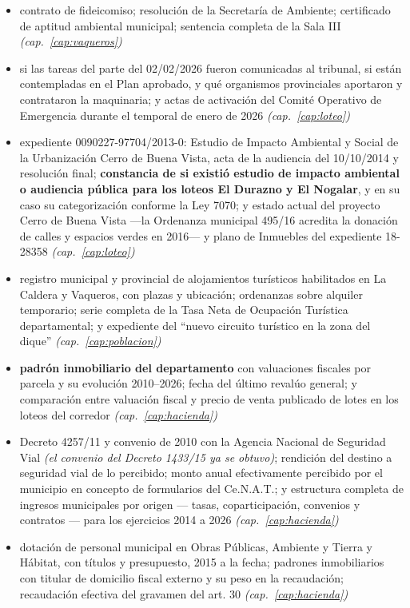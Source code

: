 \begin{itemize}[leftmargin=*]
\item contrato de fideicomiso; resolución de la Secretaría de Ambiente; certificado de aptitud ambiental municipal; sentencia completa de la Sala III \textit{(cap.\ \ref{cap:vaqueros})}
\item si las tareas del parte del 02/02/2026 fueron comunicadas al tribunal, si están contempladas en el Plan aprobado, y qué organismos provinciales aportaron y contrataron la maquinaria; y actas de activación del Comité Operativo de Emergencia durante el temporal de enero de 2026 \textit{(cap.\ \ref{cap:loteo})}
\item expediente 0090227-97704/2013-0: Estudio de Impacto Ambiental y Social de la Urbanización Cerro de Buena Vista, acta de la audiencia del 10/10/2014 y resolución final; \textbf{constancia de si existió estudio de impacto ambiental o audiencia pública para los loteos El Durazno y El Nogalar}, y en su caso su categorización conforme la Ley 7070; y estado actual del proyecto Cerro de Buena Vista ---la Ordenanza municipal 495/16 acredita la donación de calles y espacios verdes en 2016--- y plano de Inmuebles del expediente 18-28358 \textit{(cap.\ \ref{cap:loteo})}
\item registro municipal y provincial de alojamientos turísticos habilitados en La Caldera y Vaqueros, con plazas y ubicación; ordenanzas sobre alquiler temporario; serie completa de la Tasa Neta de Ocupación Turística departamental; y expediente del ``nuevo circuito turístico en la zona del dique'' \textit{(cap.\ \ref{cap:poblacion})}
\item \textbf{padrón inmobiliario del departamento} con valuaciones fiscales por parcela y su evolución 2010--2026; fecha del último revalúo general; y comparación entre valuación fiscal y precio de venta publicado de lotes en los loteos del corredor \textit{(cap.\ \ref{cap:hacienda})}
\item Decreto 4257/11 y convenio de 2010 con la Agencia Nacional de Seguridad Vial \textit{(el convenio del Decreto 1433/15 ya se obtuvo)}; rendición del destino a seguridad vial de lo percibido; monto anual efectivamente percibido por el municipio en concepto de formularios del Ce.N.A.T.; y estructura completa de ingresos municipales por origen --- tasas, coparticipación, convenios y contratos --- para los ejercicios 2014 a 2026 \textit{(cap.\ \ref{cap:hacienda})}
\item dotación de personal municipal en Obras Públicas, Ambiente y Tierra y Hábitat, con títulos y presupuesto, 2015 a la fecha; padrones inmobiliarios con titular de domicilio fiscal externo y su peso en la recaudación; recaudación efectiva del gravamen del art. 30 \textit{(cap.\ \ref{cap:hacienda})}

\end{itemize}
